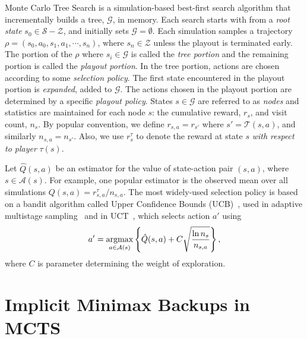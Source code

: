 \documentclass{article}
\newcommand{\argmax}{\operatornamewithlimits{argmax}}
\newcommand{\cA}{\mathcal{A}}
\newcommand{\cG}{\mathcal{G}}
\newcommand{\cS}{\mathcal{S}}
\newcommand{\cT}{\mathcal{T}}
\newcommand{\cZ}{\mathcal{Z}}
\newcommand{\hQ}{\hat{Q}}
\begin{document}
Monte Carlo Tree Search is a simulation-based best-first search algorithm that incrementally builds a tree, $\cG$, 
in memory. 
Each search starts with from a {\it root state} $s_0 \in \cS - \cZ$, and initially sets $\cG = \emptyset$. 
Each simulation samples a trajectory $\rho = (s_0, a_0, s_1, a_1, \cdots, s_n)$, where $s_n \in \cZ$ unless the playout 
is terminated early. 
The portion of the $\rho$ where $s_i \in \cG$ is called the {\it tree portion} and the remaining portion is
called the {\it playout portion}. In the tree portion, actions are chosen according to some {\it selection policy}. 
The first state encountered in the playout portion is {\it expanded}, added to $\cG$.
The actions chosen in the playout portion are determined by a specific {\it playout policy}. 
States $s \in \cG$ are referred to as {\it nodes} and statistics are  
maintained for each node $s$: the cumulative reward, $r_s$, and visit count, $n_s$. 
By popular convention, we define $r_{s,a} = r_{s'}$ where $s' = \cT(s,a)$, and similarly $n_{s,a} = n_{s'}$. 
Also, we use $r^{\tau}_s$ to denote the reward at state $s$ {\it with respect to player} $\tau(s)$. 

Let $\hQ(s,a)$ be an estimator for the value of state-action pair $(s,a)$, where $s \in \cA(s)$. 
For example, one popular estimator is the observed mean over all simulations 
$Q(s,a) = r^{\tau}_{s,a} / n_{s,a}$. 
The most widely-used selection policy is based on a bandit algorithm called Upper Confidence Bounds 
(UCB)~\cite{Auer02Finite}, used in adaptive multistage sampling~\cite{Chang2005AMS} and in 
UCT~\cite{Kocsis06Bandit}, which selects action $a'$ using
\begin{equation}
\label{eq:select-ucb}
a' = \argmax_{a \in \cA(s)} \left\{ \hQ(s,a) + C \sqrt{\frac{\ln n_s}{n_{s,a}}} \right\}, 
\end{equation}
where $C$ is parameter determining the weight of exploration. 

\section{Implicit Minimax Backups in MCTS}
\end{document}
